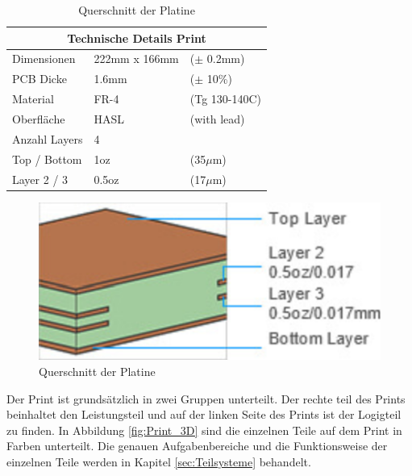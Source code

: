 \begin{table}[H]%
\centering
\parbox{0.5\textwidth}{
\begin{footnotesize}
\begin{tabular}{|l|ll|}
\hline
\multicolumn{3}{|c|}{\textbf{Technische Details Print}}\\
\hline
Dimensionen & 222mm x 166mm & ($\pm$ 0.2mm)\\
\hline
PCB Dicke & 1.6mm & ($\pm$ 10\%)\\
\hline
Material & FR-4 & (Tg 130-140C)\\
\hline
Oberfläche & HASL & (with lead)\\
\hline
Anzahl Layers & 4 & \\
\hline
Top / Bottom & 1oz & (35$\mu$m)\\
\hline
Layer 2 / 3 & 0.5oz & (17$\mu$m)\\
\hline
\end{tabular}
\end{footnotesize}
\caption{Spezifikationen der Platine \cite{jlcpcb_jlcpcb_2020}}
\label{tab:table}
}
\qquad
\begin{minipage}[c]{0.43\textwidth}%
\centering
\begin{figure}[H]
    \includegraphics[width=1\textwidth]{graphics/Print_Layers}
\caption{Querschnitt der Platine \cite{jlcpcb_jlcpcb_2020}}
\label{fig:figure}
\end{figure}
\end{minipage}
\end{table}

Der Print ist grundsätzlich in zwei Gruppen unterteilt. Der rechte teil des Prints beinhaltet den Leistungsteil und auf der linken Seite des Prints ist der Logigteil zu finden. In Abbildung \ref{fig:Print_3D} sind die einzelnen Teile auf dem Print in Farben unterteilt. Die genauen Aufgabenbereiche und die Funktionsweise der einzelnen Teile werden in Kapitel \ref{sec:Teilsysteme} behandelt.\\

